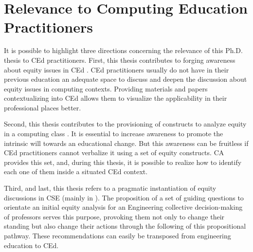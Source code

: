\section{Relevance to Computing Education Practitioners}
\label{intro-sec:rel-computing}

It is possible to highlight three directions concerning the relevance of this \gls{Ph.D.} thesis to \gls{CEd} practitioners. First, this thesis contributes to forging awareness about equity issues in \gls{CEd} \cite{bispojr:2022-educomp}. \gls{CEd} practitioners usually do not have in their previous education an adequate space to discuss and deepen the discussion about equity issues in computing contexts. Providing materials and papers contextualizing into \gls{CEd} allows them to visualize the applicability in their professional places better.

Second, this thesis contributes to the provisioning of constructs to analyze equity in a computing class \cite{bispojr:2024-nmp}. It is essential to increase awareness to promote the intrinsic will towards an educational change. But this awareness can be fruitless if \gls{CEd} practitioners cannot verbalize it using a set of equity constructs. \gls{CA} provides this set, and, during this thesis, it is possible to realize how to identify each one of them inside a situated \gls{CEd} context.

Third, and last, this thesis refers to a pragmatic instantiation of equity discussions in \gls{CSE} (mainly in \cite{bispojr:2024-online-lab}). The proposition of a set of guiding questions to orientate an initial equity analysis for an Engineering collective decision-making of professors serves this purpose, provoking them not only to change their standing but also change their actions through the following of this propositional pathway. These recommendations can easily be transposed from engineering education to \gls{CEd}.
                